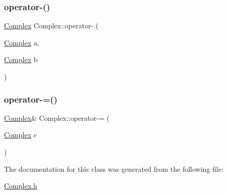 \mbox{\label{class_complex_a772894d45f888a5b57c994b03d5e6926}} 
\subsubsection{\texorpdfstring{operator-\/()}{operator-()}}
{\footnotesize\ttfamily \mbox{\hyperlink{class_complex}{Complex}} Complex\+::operator-\/ (\begin{DoxyParamCaption}\item[{\mbox{\hyperlink{class_complex}{Complex}}}]{a,  }\item[{\mbox{\hyperlink{class_complex}{Complex}}}]{b }\end{DoxyParamCaption})\hspace{0.3cm}{\ttfamily [inline]}}

\mbox{\label{class_complex_a84206afd7fc3f2b88e21b20d259146f6}} 
\subsubsection{\texorpdfstring{operator-\/=()}{operator-=()}}
{\footnotesize\ttfamily \mbox{\hyperlink{class_complex}{Complex}}\& Complex\+::operator-\/= (\begin{DoxyParamCaption}\item[{\mbox{\hyperlink{class_complex}{Complex}}}]{c }\end{DoxyParamCaption})\hspace{0.3cm}{\ttfamily [inline]}}



The documentation for this class was generated from the following file\+:\begin{DoxyCompactItemize}
\item 
\mbox{\hyperlink{_complex_8h}{Complex.\+h}}\end{DoxyCompactItemize}
